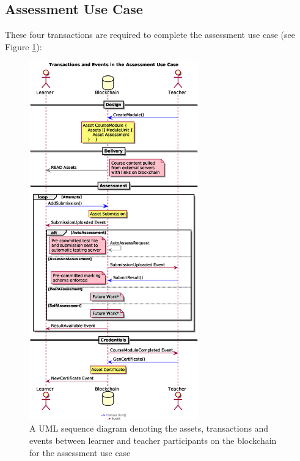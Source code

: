 \subsection{Assessment Use Case}

These four transactions are required to complete the assessment use case (see Figure \ref{fig:assessmentloop}):

\begin{figure}[!ht] 
    \centering    
    \includegraphics[width=0.65\textwidth]{assessmentloop}
    \caption[Assessment Use Case]
        {A UML sequence diagram denoting the assets, transactions and events between 
        learner and teacher participants on the blockchain for the assessment use case} 
    \label{fig:assessmentloop}
\end{figure}

